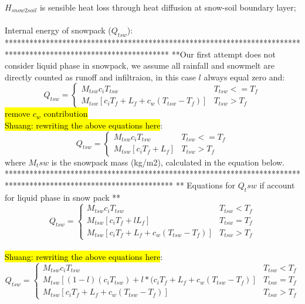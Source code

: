 \documentclass{article}
\begin{document}
$H_{snow2soil}$ is sensible heat loss through heat diffusion at snow-soil boundary layer;\\
\\
Internal energy of snowpack ($Q_{tsw}$):\\
****************************************************************************************************************
**Our first attempt does not consider liquid phase in snowpack, we assume all rainfall and snowmelt are directly counted as runoff and infiltraion, in this case $l$ always equal zero and:
\begin{equation}
Q_{tsw} =\begin{cases} 
      M_{tsw}c_iT_{tsw} & T_{tsw} <= T_f \\
      M_{tsw}[c_iT_f+L_f+c_w(T_{tsw}-T_f)]  &  T_{tsw}> T_f 
   \end{cases}
\end{equation}
\hl{remove $c_w$ contribution}\\
\hl{Shuang: rewriting the above equations here}:
\begin{equation}
Q_{tsw} =\begin{cases} 
      M_{tsw}c_iT_{tsw} & T_{tsw} <= T_f \\
      M_{tsw}[c_iT_f+L_f]  &  T_{tsw}> T_f 
   \end{cases}
\end{equation}
where $M_tsw$ is the snowpack mass (kg/m2), calculated in the equation below.
*****************************************************************************************************************
** Equations for $Q_tsw$ if account for liquid phase in snow pack **
\begin{equation}
Q_{tsw} =\begin{cases} 
      M_{tsw}c_iT_{tsw} & T_{tsw} < T_f \\
       M_{tsw}[c_iT_f+lL_f] &  T_{tsw}=T_f \\
      M_{tsw}[c_iT_f+L_f+c_w(T_{tsw}-T_f)]  &  T_{tsw}> T_f 
   \end{cases}
\end{equation}
\\
\hl{Shuang: rewriting the above equations here}:
\begin{equation}
Q_{tsw} =\begin{cases} 
      M_{tsw}c_iT_{tsw} & T_{tsw} < T_f \\
       M_{tsw}[(1-l)(c_iT_{tsw})+l*(c_iT_f+L_f+c_w(T_{tsw}-T_f)] &  T_{tsw}=T_f \\
      M_{tsw}[c_iT_f+L_f+c_w(T_{tsw}-T_f)]  &  T_{tsw}> T_f 
   \end{cases}
\end{equation}
\end{document}
